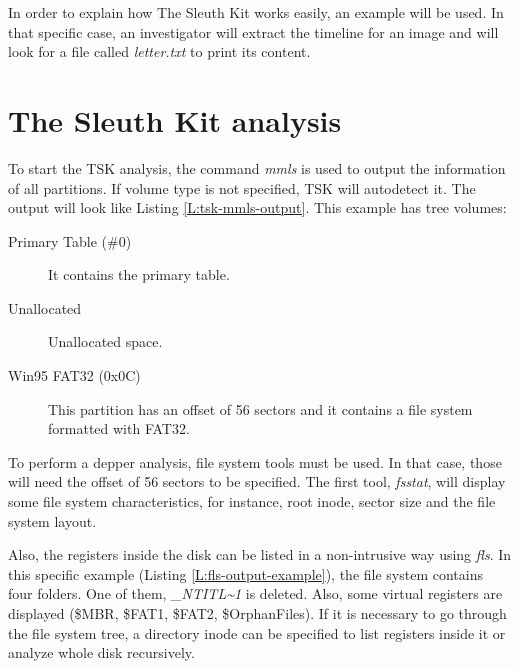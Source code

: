 In order to explain how The Sleuth Kit works easily, an example will be used.
In that specific case, an investigator will extract the timeline for an image
and will look for a file called \textit{letter.txt} to print its content.

\section{The Sleuth Kit analysis}
\label{S:tsk-analysis}

To start the TSK analysis, the command \textit{mmls} is used to output the 
information of all partitions. If volume type is not specified, TSK will
autodetect it. The output will look like Listing \ref{L:tsk-mmls-output}.
This example has tree volumes:

\begin{description}
	\item [Primary Table (\#0)]
	It contains the primary table. 
	
	\item [Unallocated]
	Unallocated space.

	\item [Win95 FAT32 (0x0C)]
	This partition has an offset of 56 sectors and it contains a file system formatted with FAT32.
	
\end{description}


To perform a depper analysis, file system tools must be used. In that case,
those will need the offset of 56 sectors to be specified. The  first tool,
\textit{fsstat}, will display some file system characteristics, for instance,
root inode, sector size and the file system layout.

Also, the registers inside the disk can be listed in a non-intrusive way using 
\textit{fls}. In this specific example (Listing \ref{L:fls-output-example}),
the file system contains four folders. One of them,  
\textit{\_NTITL\textasciitilde1} is deleted. Also, some virtual registers are
displayed (\$MBR, \$FAT1, \$FAT2, \$OrphanFiles). If it is necessary to go
through the file system tree, a directory inode can be specified to list
registers inside it or analyze whole disk recursively.


